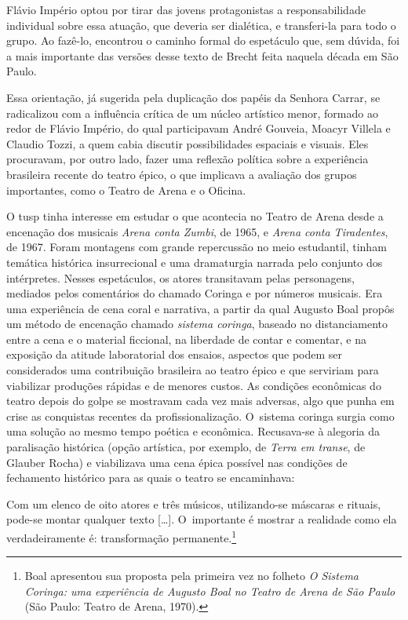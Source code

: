 Flávio Império optou por tirar das jovens protagonistas a
responsabilidade individual sobre essa atuação, que deveria ser
dialética, e transferi-la para todo o grupo. Ao fazê-lo, encontrou o
caminho formal do espetáculo que, sem dúvida, foi a mais importante das
versões desse texto de Brecht feita naquela década em São Paulo.

Essa orientação, já sugerida pela duplicação dos papéis da Senhora
Carrar, se radicalizou com a influência crítica de um núcleo
artístico menor, formado ao redor de Flávio Império, do qual
participavam André Gouveia, Moacyr Villela e Claudio Tozzi, a quem cabia
discutir possibilidades espaciais e visuais. Eles procuravam, por outro
lado, fazer uma reflexão política sobre a experiência brasileira recente
do teatro épico, o que implicava a avaliação dos grupos importantes,
como o Teatro de Arena e o Oficina.

O {\sc tusp} tinha interesse em estudar o que acontecia no Teatro de Arena
desde a encenação dos musicais {\it Arena conta Zumbi}, de 1965, e
{\it Arena conta Tiradentes}, de 1967. Foram montagens com grande
repercussão no meio estudantil, tinham temática histórica insurrecional
e uma dramaturgia narrada pelo conjunto dos intérpretes. Nesses
espetáculos, os atores transitavam pelas personagens, mediados pelos
comentários do chamado Coringa e por números musicais. Era uma
experiência de cena coral e narrativa, a partir da qual Augusto Boal
propôs um método de encenação chamado {\it sistema coringa}, baseado no
distanciamento entre a cena e o material ficcional, na liberdade de
contar e comentar, e na exposição da atitude laboratorial dos ensaios,
aspectos que podem ser considerados uma contribuição brasileira ao
teatro épico e que serviriam para viabilizar produções rápidas e de
menores custos. As condições econômicas do teatro depois do golpe se
mostravam cada vez mais adversas, algo que punha em crise as conquistas
recentes da profissionalização. O~sistema coringa surgia como uma
solução ao mesmo tempo poética e econômica. Recusava-se à alegoria da
paralisação histórica (opção artística, por exemplo, de {\it Terra em
transe}, de Glauber Rocha) e viabilizava uma cena épica possível nas
condições de fechamento histórico para as quais o teatro se encaminhava:

\startblockquote
Com um elenco de oito atores e três músicos, utilizando-se máscaras e
rituais, pode-se montar qualquer texto {[}\ldots{]}. O~importante é mostrar
a realidade como ela verdadeiramente é: transformação
permanente.\footnote{Boal apresentou sua proposta pela primeira vez no
  folheto {\it O Sistema Coringa: uma experiência de Augusto Boal no
  Teatro de Arena de São Paulo} (São Paulo: Teatro de Arena, 1970).}
\stopblockquote

